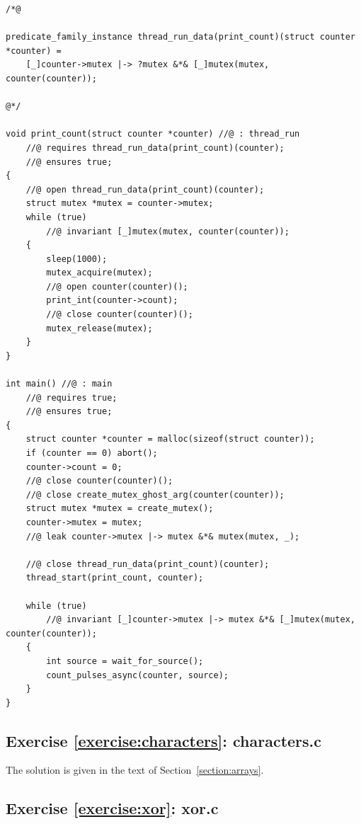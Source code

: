 \documentclass{article}
\begin{document}
\begin{lstlisting}
/*@

predicate_family_instance thread_run_data(print_count)(struct counter *counter) =
    [_]counter->mutex |-> ?mutex &*& [_]mutex(mutex, counter(counter));

@*/

void print_count(struct counter *counter) //@ : thread_run
    //@ requires thread_run_data(print_count)(counter);
    //@ ensures true;
{
    //@ open thread_run_data(print_count)(counter);
    struct mutex *mutex = counter->mutex;
    while (true)
        //@ invariant [_]mutex(mutex, counter(counter));
    {
        sleep(1000);
        mutex_acquire(mutex);
        //@ open counter(counter)();
        print_int(counter->count);
        //@ close counter(counter)();
        mutex_release(mutex);
    }
}

int main() //@ : main
    //@ requires true;
    //@ ensures true;
{
    struct counter *counter = malloc(sizeof(struct counter));
    if (counter == 0) abort();
    counter->count = 0;
    //@ close counter(counter)();
    //@ close create_mutex_ghost_arg(counter(counter));
    struct mutex *mutex = create_mutex();
    counter->mutex = mutex;
    //@ leak counter->mutex |-> mutex &*& mutex(mutex, _);

    //@ close thread_run_data(print_count)(counter);
    thread_start(print_count, counter);

    while (true)
        //@ invariant [_]counter->mutex |-> mutex &*& [_]mutex(mutex, counter(counter));
    {
        int source = wait_for_source();
        count_pulses_async(counter, source);
    }
}
\end{lstlisting}

\subsection{Exercise \ref{exercise:characters}: characters.c}\label{solution:characters}

The solution is given in the text of Section~\ref{section:arrays}.

\subsection{Exercise \ref{exercise:xor}: xor.c}\label{solution:xor}
\end{document}
